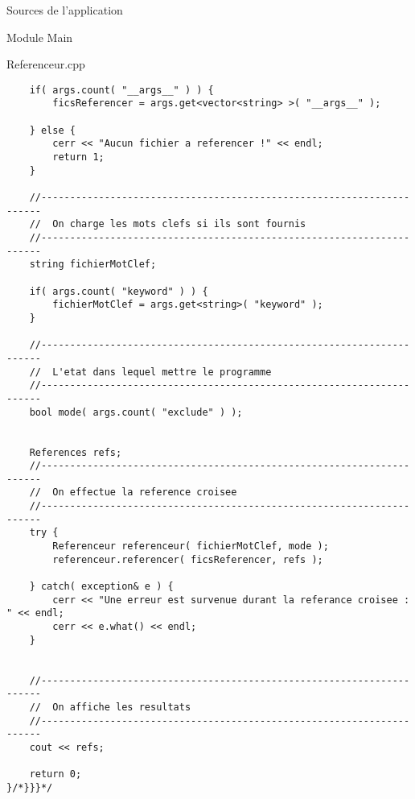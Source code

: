 \documentclass{article}
\begin{document}
\begin{section}{Sources de l'application}
\begin{subsection}{Module Main}
\begin{paragraph}{Referenceur.cpp}
\begin{verbatim}
    if( args.count( "__args__" ) ) {
        ficsReferencer = args.get<vector<string> >( "__args__" );

    } else {
        cerr << "Aucun fichier a referencer !" << endl;
        return 1;
    }

    //----------------------------------------------------------------------
    //  On charge les mots clefs si ils sont fournis
    //----------------------------------------------------------------------
    string fichierMotClef;

    if( args.count( "keyword" ) ) {
        fichierMotClef = args.get<string>( "keyword" );
    }

    //----------------------------------------------------------------------
    //  L'etat dans lequel mettre le programme
    //----------------------------------------------------------------------
    bool mode( args.count( "exclude" ) );


    References refs;
    //----------------------------------------------------------------------
    //  On effectue la reference croisee
    //----------------------------------------------------------------------
    try {
        Referenceur referenceur( fichierMotClef, mode );
        referenceur.referencer( ficsReferencer, refs );

    } catch( exception& e ) {
        cerr << "Une erreur est survenue durant la referance croisee : " << endl;
        cerr << e.what() << endl;
    }


    //----------------------------------------------------------------------
    //  On affiche les resultats
    //----------------------------------------------------------------------
    cout << refs; 

    return 0;
}/*}}}*/
  \end{verbatim}
  \end{paragraph}

  \end{subsection}

\end{section}
\end{document}
